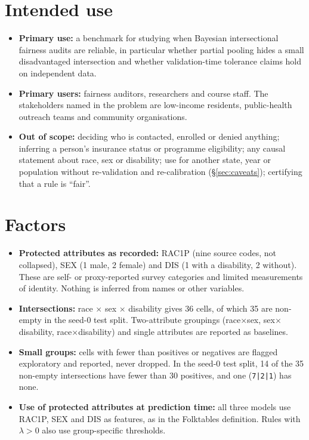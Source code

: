 \documentclass[10pt]{article}
\begin{document}
\section{Intended use}
\begin{itemize}
  \item \textbf{Primary use:} a benchmark for studying when Bayesian intersectional fairness audits are reliable, in
    particular whether partial pooling hides a small disadvantaged intersection and whether validation-time tolerance
    claims hold on independent data.
  \item \textbf{Primary users:} fairness auditors, researchers and course staff. The stakeholders named in the problem are
    low-income residents, public-health outreach teams and community organisations.
  \item \textbf{Out of scope:} deciding who is contacted, enrolled or denied anything; inferring a person's insurance status or
    programme eligibility; any causal statement about race, sex or disability; use for another state, year or population
    without re-validation and re-calibration (\S\ref{sec:caveats}); certifying that a rule is ``fair''.
\end{itemize}

\section{Factors}
\begin{itemize}
  \item \textbf{Protected attributes as recorded:} RAC1P (nine source codes, not collapsed), SEX (1 male, 2 female) and
    DIS (1 with a disability, 2 without). These are self- or proxy-reported survey categories and limited measurements of
    identity. Nothing is inferred from names or other variables.
  \item \textbf{Intersections:} race $\times$ sex $\times$ disability gives 36 cells, of which 35 are non-empty in the seed-0 test
    split. Two-attribute groupings (race$\times$sex, sex$\times$disability, race$\times$disability) and single attributes
    are reported as baselines.
  \item \textbf{Small groups:} cells with fewer than \minSupport{} positives or negatives are flagged exploratory and
    reported, never dropped. In the seed-0 test split, 14 of the 35 non-empty intersections have fewer than 30 positives,
    and one (\texttt{7|2|1}) has none.
  \item \textbf{Use of protected attributes at prediction time:} all three models use RAC1P, SEX and DIS as features, as in
    the Folktables definition. Rules with $\lambda>0$ also use group-specific thresholds.
\end{itemize}
\end{document}
